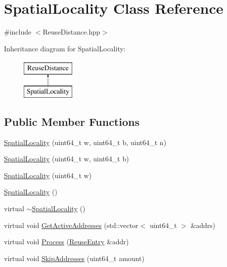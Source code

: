 \hypertarget{class_spatial_locality}{
\section{SpatialLocality Class Reference}
\label{class_spatial_locality}
}


{\ttfamily \#include $<$ReuseDistance.hpp$>$}

Inheritance diagram for SpatialLocality:\begin{figure}[H]
\begin{center}
\leavevmode
\includegraphics[height=2cm]{class_spatial_locality}
\end{center}
\end{figure}
\subsection*{Public Member Functions}
\begin{DoxyCompactItemize}
\item 
\hyperlink{class_spatial_locality_aff3106d38ff5ba3e6ecaec0c7214eaea}{SpatialLocality} (uint64\_\-t w, uint64\_\-t b, uint64\_\-t n)
\item 
\hyperlink{class_spatial_locality_a908469b7cd8a92c22a8bae4e2d4c5ade}{SpatialLocality} (uint64\_\-t w, uint64\_\-t b)
\item 
\hyperlink{class_spatial_locality_a63d45541023cfc370b079f1011cab5b8}{SpatialLocality} (uint64\_\-t w)
\item 
\hyperlink{class_spatial_locality_a449d21fbe63121ea92aaf5c1e0b8cb9c}{SpatialLocality} ()
\item 
virtual \hyperlink{class_spatial_locality_abfdaf3722786c5ad9ea65f885cbbebc6}{$\sim$SpatialLocality} ()
\item 
virtual void \hyperlink{class_spatial_locality_afef7ecfce7f238dbef37499e08edfb98}{GetActiveAddresses} (std::vector$<$ uint64\_\-t $>$ \&addrs)
\item 
virtual void \hyperlink{class_spatial_locality_a72a96a67e1791851927dbf3e5ceb206f}{Process} (\hyperlink{struct_reuse_entry}{ReuseEntry} \&addr)
\item 
virtual void \hyperlink{class_spatial_locality_acdfe7e6ac7891c4673cb7023af7227e0}{SkipAddresses} (uint64\_\-t amount)
\end{DoxyCompactItemize}
